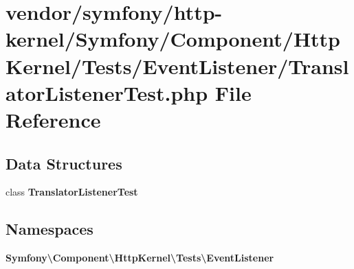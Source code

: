 \section{vendor/symfony/http-\/kernel/\+Symfony/\+Component/\+Http\+Kernel/\+Tests/\+Event\+Listener/\+Translator\+Listener\+Test.php File Reference}
\label{_translator_listener_test_8php}
\subsection*{Data Structures}
\begin{DoxyCompactItemize}
\item 
class {\bf Translator\+Listener\+Test}
\end{DoxyCompactItemize}
\subsection*{Namespaces}
\begin{DoxyCompactItemize}
\item 
 {\bf Symfony\textbackslash{}\+Component\textbackslash{}\+Http\+Kernel\textbackslash{}\+Tests\textbackslash{}\+Event\+Listener}
\end{DoxyCompactItemize}
